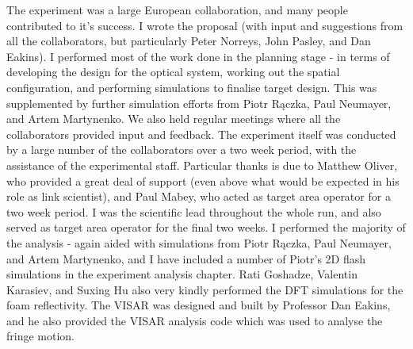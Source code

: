 
The experiment was a large European collaboration, and many people contributed to it's success. I wrote the proposal (with input and suggestions from all the collaborators, but particularly Peter Norreys, John Pasley, and Dan Eakins). I performed most of the work done in the planning stage - in terms of developing the design for the optical system, working out the spatial configuration, and performing simulations to finalise target design. This was supplemented by further simulation efforts from Piotr R\k{a}czka, Paul Neumayer, and Artem Martynenko. We also held regular meetings where all the collaborators provided input and feedback. The experiment itself was conducted by a large number of the collaborators over a two week period, with the assistance of the experimental staff. Particular thanks is due to Matthew Oliver, who provided a great deal of support (even above what would be expected in his role as link scientist), and Paul Mabey, who acted as target area operator for a two week period. I was the scientific lead throughout the whole run, and also served as target area operator for the final two weeks. I performed the majority of the analysis - again aided with simulations from Piotr R\k{a}czka, Paul Neumayer, and Artem Martynenko, and I have included a number of Piotr's 2D flash simulations in the experiment analysis chapter. Rati Goshadze, Valentin  Karasiev, and Suxing Hu also very kindly performed the DFT simulations for the foam reflectivity. The VISAR was designed and built by Professor Dan Eakins, and he also provided the VISAR analysis code which was used to analyse the fringe motion.

